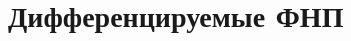 \documentclass[../main.tex]{subfiles}
\begin{document}
 \chapter{Дифференцируемые ФНП}
 
 
 
 
\end{document}
